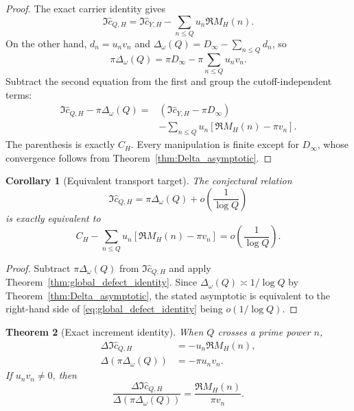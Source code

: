 \documentclass[11pt]{amsart}
\numberwithin{equation}{section}
\theoremstyle{plain}
\newtheorem{theorem}{Theorem}[section]
\newtheorem{corollary}[theorem]{Corollary}
\theoremstyle{definition}
\theoremstyle{remark}
\newcommand{\1}{\mathbf{1}}
\begin{document}
\begin{proof}
The exact carrier identity gives
\begin{equation}
\Im\widehat c_{Q,H}
=
\Im\widehat c_{Y,H}
-
\sum_{n\leq Q}u_n\Re M_H(n).
\label{eq:global_defect_proof_carrier}
\end{equation}
On the other hand, \(d_n=u_nv_n\) and
\(\Delta_\omega(Q)=D_\infty-\sum_{n\leq Q}d_n\), so
\begin{equation}
\pi\Delta_\omega(Q)
=
\pi D_\infty
-
\pi\sum_{n\leq Q}u_nv_n.
\label{eq:global_defect_proof_Delta}
\end{equation}
Subtract the second equation from the first and group the cutoff-independent
terms:
\begin{align}
\Im\widehat c_{Q,H}-\pi\Delta_\omega(Q)
={}&
\left(\Im\widehat c_{Y,H}-\pi D_\infty\right)
\label{eq:global_defect_proof_group_one}
\\
&-
\sum_{n\leq Q}u_n
\left[\Re M_H(n)-\pi v_n\right].
\label{eq:global_defect_proof_group_two}
\end{align}
The parenthesis is exactly \(C_H\).  Every manipulation is finite except
for \(D_\infty\), whose convergence follows from
Theorem~\ref{thm:Delta_asymptotic}.
\end{proof}

\begin{corollary}[Equivalent transport target]
\label{cor:transport_target}
The conjectural relation
\begin{equation}
\Im\widehat c_{Q,H}
=
\pi\Delta_\omega(Q)
+
o\left(\frac1{\log Q}\right)
\label{eq:transport_relation}
\end{equation}
is exactly equivalent to
\begin{equation}
\boxed{
C_H
-
\sum_{n\leq Q}
u_n\left[
\Re M_H(n)-\pi v_n
\right]
=
o\left(\frac1{\log Q}\right).
}
\label{eq:equivalent_transport_target}
\end{equation}
\end{corollary}

\begin{proof}
Subtract \(\pi\Delta_\omega(Q)\) from
\(\Im\widehat c_{Q,H}\) and apply
Theorem~\ref{thm:global_defect_identity}.  Since
\(\Delta_\omega(Q)\asymp1/\log Q\) by
Theorem~\ref{thm:Delta_asymptotic}, the stated asymptotic is equivalent
to the right-hand side of \eqref{eq:global_defect_identity} being
\(o(1/\log Q)\).
\end{proof}

\begin{theorem}[Exact increment identity]
\label{thm:increment_identity}
When \(Q\) crosses a prime power \(n\),
\begin{align}
\Delta\Im\widehat c_{Q,H}
&=
-u_n\Re M_H(n),
\label{eq:increment_c}
\\
\Delta\left(\pi\Delta_\omega(Q)\right)
&=
-\pi u_nv_n.
\label{eq:increment_Delta}
\end{align}
If \(u_nv_n\neq0\), then
\begin{equation}
\boxed{
\frac{
\Delta\Im\widehat c_{Q,H}
}{
\Delta(\pi\Delta_\omega(Q))
}
=
\frac{\Re M_H(n)}{\pi v_n}.
}
\label{eq:increment_ratio}
\end{equation}
\end{theorem}
\end{document}
